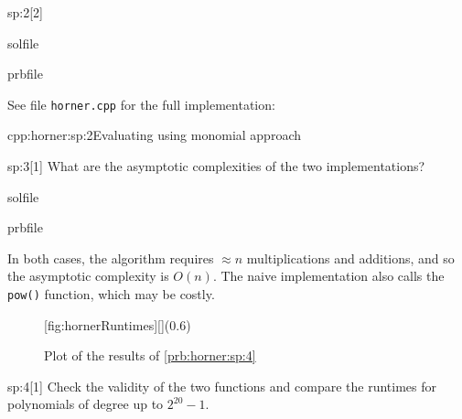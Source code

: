 \begin{samproblem}
\begin{subproblem}{sp:2}[2]
  \begin{samwriteprbpart}{solfile}
    \begin{writeverbatim}{prbfile}
      \begin{samsolution}
        See file \texttt{horner.cpp} for the full implementation:
        \begin{samcode}[C++-code]{cpp:horner:sp:2}{Evaluating using monomial approach}
        \end{samcode}
     \end{samsolution}
    \end{writeverbatim}
  \end{samwriteprbpart}

\end{subproblem}

\begin{subproblem}{sp:3}[1]
  What are the asymptotic complexities of the two implementations?

  \begin{samwriteprbpart}{solfile}
    \begin{writeverbatim}{prbfile}
      \begin{samsolution}
        In both cases, the algorithm requires $\approx n$ multiplications and additions,
        and so the asymptotic complexity is $O(n)$. The naive implementation also calls
        the \texttt{pow()} function, which may be costly. 
        \begin{figure}[h]
          \centering
          [fig:hornerRuntimes][](0.6\textwidth)
          \caption{Plot of the results of \ref{prb:horner:sp:4}}
        \end{figure}
     \end{samsolution}
    \end{writeverbatim}
  \end{samwriteprbpart}

\end{subproblem}

\begin{subproblem}{sp:4}[1]
  Check the validity of the two functions and compare the runtimes for polynomials of degree up to $2^{20}-1$.


\end{subproblem}
\end{samproblem}
